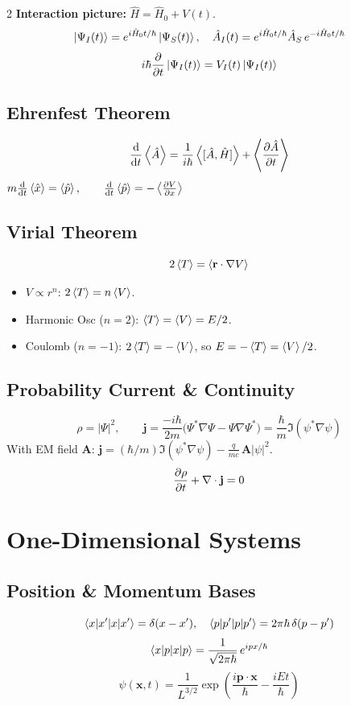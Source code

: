 \documentclass[9pt,a4paper]{article} %
\newcommand{\Hhat}{\hat{H}}
\newcommand{\phat}{\hat{p}}
\newcommand{\xhat}{\hat{x}}
\begin{document}
\begin{multicols}{2}
\textbf{Interaction picture:} $\Hhat=\Hhat_0+V(t)$.
\[
\ket{\Psi_I(t)}=e^{i\Hhat_0 t/\hbar}\ket{\Psi_S(t)}, \quad
\hat{A}_I(t)=e^{i\Hhat_0 t/\hbar}\hat{A}_S\,e^{-i\Hhat_0 t/\hbar}
\]
\[
i\hbar\pdv{}{t}\ket{\Psi_I(t)}=V_I(t)\ket{\Psi_I(t)}
\]

\subsection{Ehrenfest Theorem}
\[
\dv{}{t}\ev{\hat{A}}=\frac{1}{i\hbar}\ev{[\hat{A},\Hhat]}+\ev{\pdv{\hat{A}}{t}}
\]
$m\dv{}{t}\ev{\xhat}=\ev{\phat},\qquad \dv{}{t}\ev{\phat}=-\ev{\pdv{V}{x}}$

\subsection{Virial Theorem}
\[
2\ev{T}=\ev{\mathbf{r}\cdot\nabla V}
\]
\begin{itemize}
  \item $V\propto r^n$: $2\ev{T}=n\ev{V}$.
  \item Harmonic Osc ($n=2$): $\ev{T}=\ev{V}=E/2$.
  \item Coulomb ($n=-1$): $2\ev{T}=-\ev{V}$, so $E=-\ev{T}=\ev{V}/2$.
\end{itemize}

\subsection{Probability Current \& Continuity}
\[
\rho=|\Psi|^2,\qquad \mathbf{j}=\frac{-i\hbar}{2m}\bigl(\Psi^*\nabla\Psi-\Psi\nabla\Psi^*\bigr)=\frac{\hbar}{m}\Im(\psi^*\nabla\psi)
\]
With EM field $\mathbf{A}$: $\mathbf{j}=(\hbar/m)\Im(\psi^*\nabla\psi)-\frac{q}{mc}\,\mathbf{A}|\psi|^2$.
\[
\pdv{\rho}{t}+\nabla\cdot\mathbf{j}=0
\]

\section{One-Dimensional Systems}

\subsection{Position \& Momentum Bases}
\[
\braket{x|x'}=\delta(x-x'),\quad \braket{p|p'}=2\pi\hbar\,\delta(p-p')
\]
\[
\braket{x|p}=\frac{1}{\sqrt{2\pi\hbar}}\,e^{ipx/\hbar}
\]
\[
\psi(\mathbf{x},t) = \frac{1}{L^{3/2}} \exp\!\left( \frac{i \mathbf{p} \cdot \mathbf{x}}{\hbar} - \frac{iEt}{\hbar} \right)
\]


\end{multicols}
\end{document}
